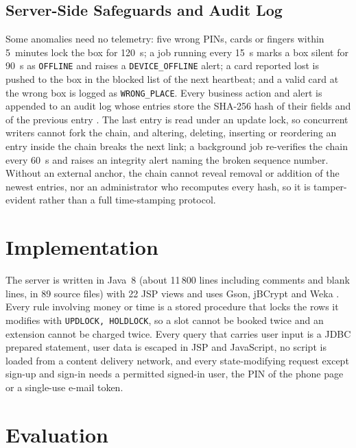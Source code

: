 \documentclass[manuscript,screen]{acmart}
\begin{document}
\subsection{Server-Side Safeguards and Audit Log}\label{sec:safeguards}

Some anomalies need no telemetry: five wrong PINs, cards or fingers within 5~minutes lock the box for 120~s; a job
running every 15~s marks a box silent for 90~s as \texttt{OFFLINE} and raises a \texttt{DEVICE\_OFFLINE} alert; a card
reported lost is pushed to the box in the blocked list of the next heartbeat; and a valid card at the wrong box is
logged as \texttt{WRONG\_PLACE}. Every business action and alert is appended to an audit log whose entries store the
SHA-256 hash of their fields and of the previous entry \cite{haber1991timestamp}. The
last entry is read under an update lock, so concurrent writers cannot fork the chain, and altering, deleting,
inserting or reordering an entry inside the chain breaks the next link; a background job re-verifies the chain every
60~s and raises an integrity alert naming the broken sequence number. Without an external anchor, the chain cannot
reveal removal or addition of the newest entries, nor an administrator who recomputes every hash, so it is
tamper-evident rather than a full time-stamping protocol.

\section{Implementation}\label{sec:impl}

The server is written in Java~8 (about 11\,800 lines including comments and blank lines, in 89 source files) with
22 JSP views and uses Gson, jBCrypt \cite{provos1999bcrypt} and Weka \cite{hall2009weka}. Every rule involving money
or time is a stored procedure that locks the rows it modifies with \texttt{UPDLOCK, HOLDLOCK}, so a slot cannot be
booked twice and an extension cannot be charged twice. Every query that carries user input is a JDBC prepared
statement, user data is escaped in JSP and JavaScript, no script is loaded from a content delivery network, and every
state-modifying request except sign-up and sign-in needs a permitted signed-in user, the PIN of the phone page or a
single-use e-mail token.

\section{Evaluation}\label{sec:ml}
\end{document}
